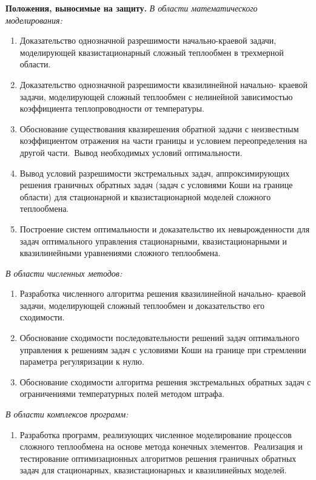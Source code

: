 \textbf{Положения, выносимые на защиту.}
\textit{В области математического моделирования:}
\begin{enumerate}[leftmargin=5.5mm]
    \item Доказательство однозначной разрешимости начально-краевой задачи,
моделирующей квазистационарный сложный теплообмен в трехмерной
области.
    \item Доказательство однозначной разрешимости квазилинейной начально-
краевой задачи, моделирующей сложный теплообмен с нелинейной
зависимостью коэффициента теплопроводности от температуры.
    \item Обоснование существования квазирешения обратной задачи с неизвестным
коэффициентом отражения на части границы и условием переопределения на
другой части.\ Вывод необходимых условий оптимальности.
    \item Вывод условий разрешимости экстремальных задач, аппроксимирующих
решения граничных обратных задач (задач с условиями Коши на границе
области) для стационарной и квазистационарной моделей сложного
теплообмена.
    \item Построение систем оптимальности и доказательство их невырожденности
для задач оптимального управления стационарными, квазистационарными и
квазилинейными уравнениями сложного теплообмена.
    \setcounter{nameOfYourChoice}{\value{enumi}}
\end{enumerate}
\textit{В области численных методов:}
\begin{enumerate}[leftmargin=5.5mm]\setcounter{enumi}{\value{nameOfYourChoice}}
    \item Разработка численного алгоритма решения квазилинейной начально-
краевой задачи, моделирующей сложный теплообмен и доказательство его
сходимости.
    \item Обоснование сходимости последовательности решений задач
оптимального управления к решениям задач с условиями Коши на границе
при стремлении параметра регуляризации к нулю.
    \item Обоснование сходимости алгоритма решения экстремальных обратных
задач с ограничениями температурных полей методом штрафа.
\setcounter{nameOfYourChoice}{\value{enumi}}
\end{enumerate}
\textit{В области комплексов программ:}
\begin{enumerate}[leftmargin=5.5mm]\setcounter{enumi}{\value{nameOfYourChoice}}
    \item Разработка программ, реализующих численное моделирование процессов
сложного теплообмена на основе метода конечных элементов.\ Реализация и
тестирование оптимизационных алгоритмов решения граничных обратных
задач для стационарных, квазистационарных и квазилинейных моделей.
\end{enumerate}


